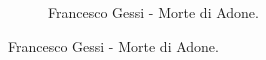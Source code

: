 \documentclass[12pt,a4paper]{article}
\begin{document}
\begin{enumerate}
\begin{figure}[h]
\begin{subfigure}[h] {0.4\textwidth}
			\caption{Francesco Gessi - Morte di Adone.}
		\end{subfigure}
	\end{figure}
	
	\end{enumerate}
\newpage
\listoffigures
\end{document}
